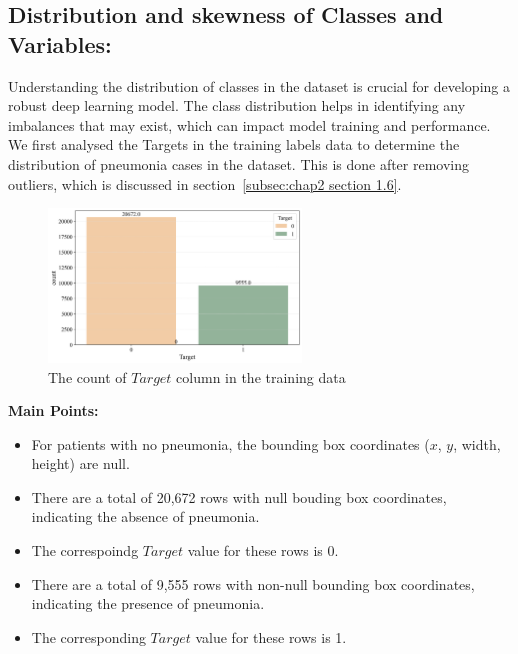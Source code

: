 \subsection{Distribution and skewness of Classes and Variables:}
\label{subsec:chap2 section 1.2}

Understanding the distribution of classes in the dataset is crucial for developing a robust deep learning model. The class distribution helps in identifying any imbalances that may exist, which can impact model training and performance. We first analysed the Targets in the training labels data to determine the distribution of pneumonia cases in the dataset. This is done after removing outliers, which is discussed in section~\ref{subsec:chap2 section 1.6}.

\begin{figure}[H]
    \begin{center}
        \includegraphics[width = 0.6\textwidth]{figures/Figure1.png}
        \caption{The count of $Target$ column in the training data}
        \label{fig:cha-2 figure1}
    \end{center}
\end{figure}

\textbf{Main Points:}

\begin{itemize}
    \item For patients with no pneumonia, the bounding box coordinates ($x$, $y$, width, height) are null.
    \item There are a total of 20,672 rows with null bouding box coordinates, indicating the absence of pneumonia.
    \item The correspoindg $Target$ value for these rows is 0.
    \item There are a total of 9,555 rows with non-null bounding box coordinates, indicating the presence of pneumonia.
    \item The corresponding $Target$ value for these rows is 1.
\end{itemize}

